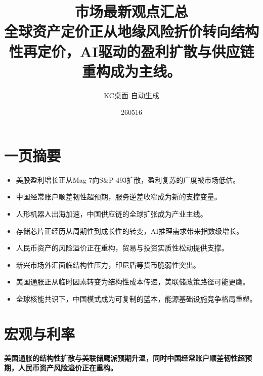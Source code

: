 \documentclass[11pt]{ctexart}
\title{\textbf{市场最新观点汇总}\\[0.4em]{\large 全球资产定价正从地缘风险折价转向结构性再定价，AI驱动的盈利扩散与供应链重构成为主线。}}
\author{KC桌面 自动生成}
\date{260516}
\begin{document}
\maketitle
\section*{一页摘要}
\begin{itemize}
  \item 美股盈利增长正从Mag 7向S\&P 493扩散，盈利复苏的广度被市场低估。
  \item 中国经常账户顺差韧性超预期，服务逆差收窄成为新的支撑变量。
  \item 人形机器人出海加速，中国供应链的全球扩张成为产业主线。
  \item 存储芯片正经历从周期性到成长性的转变，AI推理需求带来指数级增长。
  \item 人民币资产的风险溢价正在重构，贸易与投资实质性松动提供支撑。
  \item 新兴市场外汇面临结构性压力，印尼盾等货币脆弱性突出。
  \item 美国通胀正从临时因素转变为结构性成本传递，美联储政策路径可能更鹰。
  \item 全球核能共识下，中国模式成为可复制的蓝本，能源基础设施竞争格局重塑。
\end{itemize}
\section{宏观与利率}
\textbf{美国通胀的结构性扩散与美联储鹰派预期升温，同时中国经常账户顺差韧性超预期，人民币资产风险溢价正在重构。}
\end{document}
